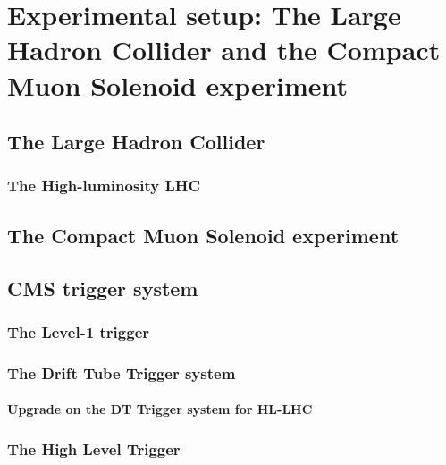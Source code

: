 \documentclass[../main.tex]{subfiles}
\begin{document}
\chapter{Experimental setup: The Large Hadron Collider and the Compact Muon Solenoid experiment}

\section{The Large Hadron Collider}

\subsection{The High-luminosity LHC}

\section{The Compact Muon Solenoid experiment}

\section{CMS trigger system}

\subsection{The Level-1 trigger}

\subsection{The Drift Tube Trigger system}

\subsubsection{Upgrade on the DT Trigger system for HL-LHC}

\subsection{The High Level Trigger}
\end{document}
